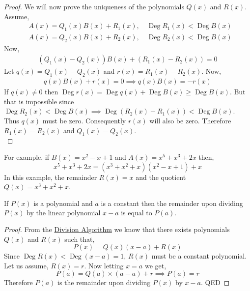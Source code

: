 \documentclass[11pt,numbers=noenddot,svgnames,dvipsnames]{scrartcl}
\DeclareMathOperator{\Deg}{Deg}
\begin{document}
\begin{proof}
    We will now prove the uniqueness of the polynomials $Q(x)$ and $R(x)$. Assume,
    \begin{align*}
        & A(x) = Q_{1}(x)B(x) + R_{1}(x), \quad \Deg R_{1}(x) < \Deg B(x) \\
        & A(x) = Q_{2}(x)B(x) + R_{2}(x), \quad \Deg R_{2}(x) < \Deg B(x)
    \end{align*}
    Now,
    \begin{align*}
                 \left(Q_{1}(x) - Q_{2}(x)\right)B(x) + \left(R_{1}(x) - R_{2}(x)\right) = 0
    \end{align*}
    Let $q(x) = Q_{1}(x) - Q_{2}(x)$ and $r(x) = R_{1}(x) - R_{2}(x)$. Now,
    \begin{align*}
                 q(x)B(x) + r(x) = 0 
        \implies q(x)B(x) = -r(x)
    \end{align*}
    If $q(x)\neq 0$ then $\Deg r(x) = \Deg q(x) + \Deg B(x) \geq \Deg B(x)$. But that is impossible since 
    $\Deg R_{2}(x) < \Deg B(x) \implies \Deg \left(R_{2}(x) - R_{1}(x)\right) < \Deg B(x)$. Thus $q(x)$ must be zero. 
    Consequently $r(x)$ will also be zero. Therefore $R_{1}(x)=R_{2}(x)$ and $Q_{1}(x)=Q_{2}(x)$. \\
\end{proof}

For example, if $B(x)= x^{2}-x+1$ and $A(x)=x^{5}+x^{3}+2x$ then,
\[
    x^{5}+x^{3}+2x = \left(x^{3}+x^{2}+x\right) \left(x^{2}-x+1\right) +x
\]
In this example, the remainder $R(x)=x$ and the quotient $Q(x)=x^{3}+x^{2}+x$. \\

\begin{theorem}\label{thm:remainder-theorem}
    If $P(x)$ is a polynomial and $a$ is a constant then the remainder upon dividing $P(x)$ by the linear 
    polynomial $x-a$ is equal to $P(a)$.
\end{theorem}
\begin{proof}
    From the \hyperref[thm:division-algorithm]{Division Algorithm} we know that there exists polynomials $Q(x)$ and $R(x)$ 
    such that,
    \[
        P(x) = Q(x)\left(x-a\right) + R(x)
    \]
    Since $\Deg R(x) < \Deg (x-a)=1$, $R(x)$ must be a constant polynomial. Let us assume, $R(x)=r$. 
    Now letting $x=a$ we get,
    \[
        P(a) = Q(a)\times (a-a) + r \implies P(a) = r
    \]
    Therefore $P(a)$ is the remainder upon dividing $P(x)$ by $x-a$. \textsf{QED}
\end{proof}
\end{document}
